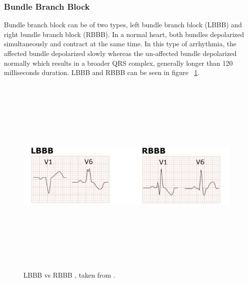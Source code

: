 \subsubsection{Bundle Branch Block}
Bundle branch block can be of two types, left bundle branch block (LBBB) and right bundle branch block (RBBB). In a normal heart, both bundles depolarized simultaneously and contract at the same time. In this type of arrhythmia, the affected bundle depolarized slowly whereas the un-affected bundle depolarized normally which results in a broader QRS complex, generally longer than 120 milliseconds duration. LBBB and RBBB can be seen in figure ~\ref{fig:LRBBB}.


\begin{figure}[htpb]
	\centering
	\includegraphics[width=12cm,height=10cm,keepaspectratio=true]{images/LRBBB}
	\caption{
		LBBB vs RBBB , taken from \cite{bilagi}.
	}
	\label{fig:LRBBB}
\end{figure}